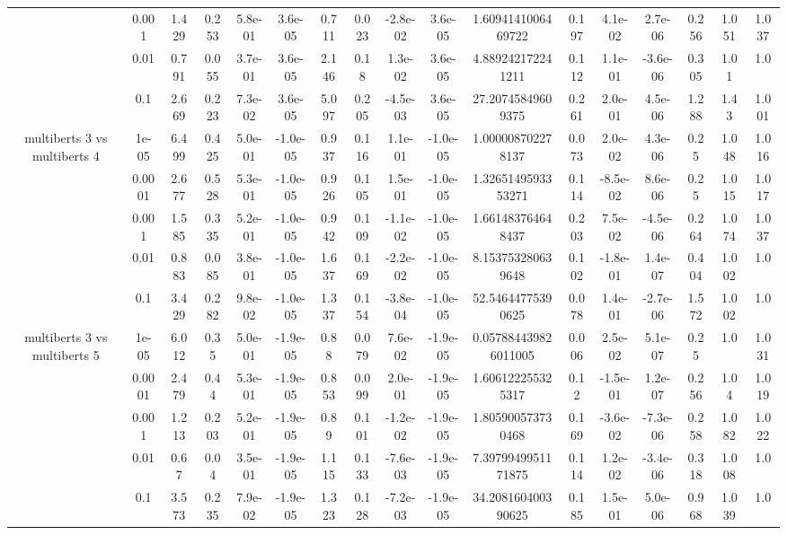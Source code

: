 \begin{tabular}{|c|c|c|c|c|c|c|c|c|c|c|c|c|c|c|c|c|}
 & 0.001 & 1.429 & 0.253 & 5.8e-01 & 3.6e-05 & 0.711 & 0.023 & -2.8e-02 & 3.6e-05 & 1.6094141006469722 & 0.197 & 4.1e-02 & 2.7e-06 & 0.256 & 1.051 & 1.037 \\
 & 0.01 & 0.791 & 0.055 & 3.7e-01 & 3.6e-05 & 2.146 & 0.18 & 1.3e-02 & 3.6e-05 & 4.889242172241211 & 0.112 & 1.1e-01 & -3.6e-06 & 0.305 & 1.01 & 1.0 \\
 & 0.1 & 2.669 & 0.223 & 7.3e-02 & 3.6e-05 & 5.097 & 0.205 & -4.5e-03 & 3.6e-05 & 27.20745849609375 & 0.261 & 2.0e-01 & 4.5e-06 & 1.288 & 1.43 & 1.001 \\
\hline
\multirow{5}{*}{multiberts 3 vs multiberts 4} & 1e-05 & 6.499 & 0.425 & 5.0e-01 & -1.0e-05 & 0.937 & 0.116 & 1.1e-01 & -1.0e-05 & 1.000008702278137 & 0.073 & 2.0e-02 & 4.3e-06 & 0.25 & 1.048 & 1.016 \\
 & 0.0001 & 2.677 & 0.528 & 5.3e-01 & -1.0e-05 & 0.926 & 0.105 & 1.5e-01 & -1.0e-05 & 1.3265149593353271 & 0.114 & -8.5e-02 & 8.6e-06 & 0.25 & 1.015 & 1.017 \\
 & 0.001 & 1.585 & 0.335 & 5.2e-01 & -1.0e-05 & 0.942 & 0.109 & -1.1e-02 & -1.0e-05 & 1.661483764648437 & 0.203 & 7.5e-02 & -4.5e-06 & 0.264 & 1.074 & 1.037 \\
 & 0.01 & 0.883 & 0.085 & 3.8e-01 & -1.0e-05 & 1.637 & 0.169 & -2.2e-02 & -1.0e-05 & 8.153753280639648 & 0.102 & -1.8e-01 & 1.4e-07 & 0.404 & 1.002 & 1.0 \\
 & 0.1 & 3.429 & 0.282 & 9.8e-02 & -1.0e-05 & 1.337 & 0.154 & -3.8e-04 & -1.0e-05 & 52.54644775390625 & 0.078 & 1.4e-01 & -2.7e-06 & 1.572 & 1.002 & 1.0 \\
\hline
\multirow{5}{*}{multiberts 3 vs multiberts 5} & 1e-05 & 6.012 & 0.35 & 5.0e-01 & -1.9e-05 & 0.88 & 0.079 & 7.6e-02 & -1.9e-05 & 0.057884439826011005 & 0.006 & 2.5e-02 & 5.1e-07 & 0.25 & 1.0 & 1.031 \\
 & 0.0001 & 2.479 & 0.44 & 5.3e-01 & -1.9e-05 & 0.853 & 0.099 & 2.0e-01 & -1.9e-05 & 1.606122255325317 & 0.12 & -1.5e-01 & 1.2e-07 & 0.256 & 1.04 & 1.019 \\
 & 0.001 & 1.213 & 0.203 & 5.2e-01 & -1.9e-05 & 0.89 & 0.101 & -1.2e-02 & -1.9e-05 & 1.805900573730468 & 0.169 & -3.6e-02 & -7.3e-06 & 0.258 & 1.082 & 1.022 \\
 & 0.01 & 0.67 & 0.04 & 3.5e-01 & -1.9e-05 & 1.115 & 0.133 & -7.6e-03 & -1.9e-05 & 7.3979949951171875 & 0.114 & 1.2e-02 & -3.4e-06 & 0.318 & 1.008 & 1.0 \\
 & 0.1 & 3.573 & 0.235 & 7.9e-02 & -1.9e-05 & 1.323 & 0.128 & -7.2e-03 & -1.9e-05 & 34.208160400390625 & 0.185 & 1.5e-01 & 5.0e-06 & 0.968 & 1.039 & 1.0 \\

\end{tabular}
